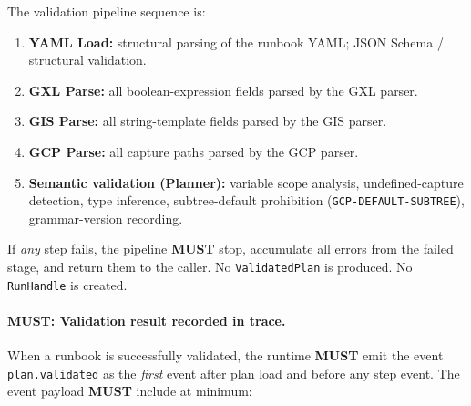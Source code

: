 The validation pipeline sequence is:

\begin{enumerate}
  \item \textbf{YAML Load:} structural parsing of the runbook YAML; JSON Schema
    / structural validation.
  \item \textbf{GXL Parse:} all boolean-expression fields parsed by the GXL
    parser.
  \item \textbf{GIS Parse:} all string-template fields parsed by the GIS
    parser.
  \item \textbf{GCP Parse:} all capture paths parsed by the GCP parser.
  \item \textbf{Semantic validation (Planner):} variable scope analysis,
    undefined-capture detection, type inference, subtree-default prohibition
    (\texttt{GCP-DEFAULT-SUBTREE}), grammar-version recording.
\end{enumerate}

If \emph{any} step fails, the pipeline \textbf{MUST} stop, accumulate all
errors from the failed stage, and return them to the caller.  No
\texttt{ValidatedPlan} is produced.  No \texttt{RunHandle} is created.

\paragraph{MUST: Validation result recorded in trace.}
When a runbook is successfully validated, the runtime \textbf{MUST} emit the
event \texttt{plan.validated} as the \emph{first} event after plan load and
before any step event.  The event payload \textbf{MUST} include at minimum:

